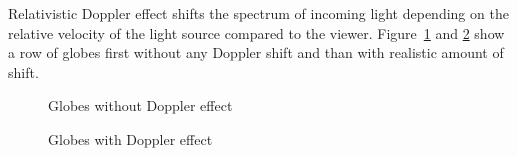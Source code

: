 \documentclass{egpubl}
\begin{document}
Relativistic Doppler effect shifts the spectrum of incoming light depending on the relative velocity of the light source compared to the viewer. Figure~\ref{fig:doppler_effect_1} and \ref{fig:doppler_effect_2} show a row of globes first without any Doppler shift and than with realistic amount of shift.
\begin{figure}[htb]
\center
{}
\caption{Globes without Doppler effect}
\label{fig:doppler_effect_1}
\end{figure}
\begin{figure}[htb]
\center
{}
\caption{Globes with Doppler effect}
\label{fig:doppler_effect_2}
\end{figure}
\end{document}
